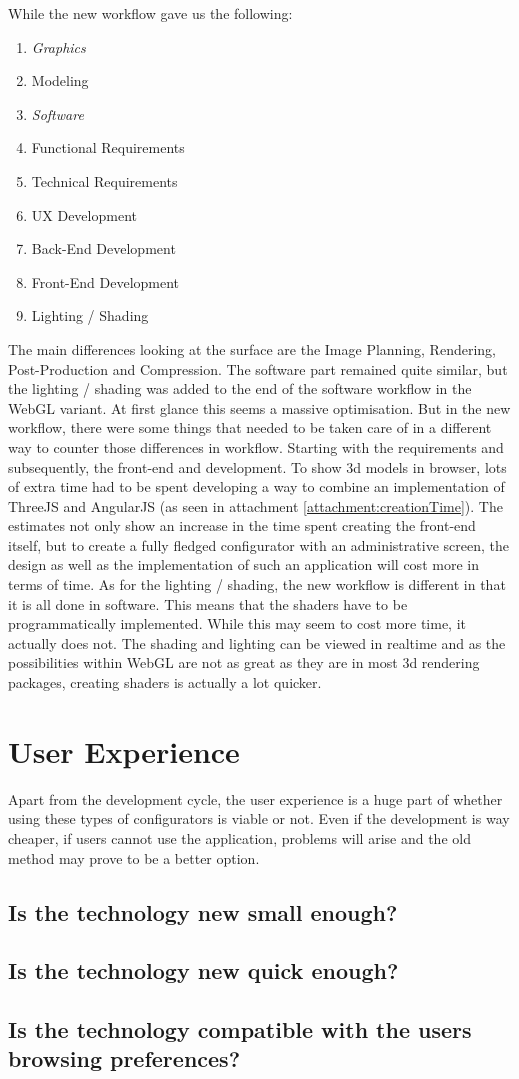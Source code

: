 While the new workflow gave us the following:
\begin{enumerate}
	\item {\textit{Graphics}}
	\item {Modeling}
	\item {\textit{Software}}
	\item {Functional Requirements}
	\item {Technical Requirements}
	\item {UX Development}
	\item {Back-End Development}
	\item {Front-End Development}
	\item {Lighting / Shading}
\end{enumerate}

The main differences looking at the surface are the Image Planning, Rendering, Post-Production and Compression. The software part remained quite similar, but the lighting / shading was added to the end of the software workflow in the WebGL variant. At first glance this seems a massive optimisation. But in the new workflow, there were some things that needed to be taken care of in a different way to counter those differences in workflow. Starting with the requirements and subsequently, the front-end and development. To show 3d models in browser, lots of extra time had to be spent developing a way to combine an implementation of ThreeJS and AngularJS (as seen in attachment \ref{attachment:creationTime}). The estimates not only show an increase in the time spent creating the front-end itself, but to create a fully fledged configurator with an administrative screen, the design as well as the implementation of such an application will cost more in terms of time.\newline
As for the lighting / shading, the new workflow is different in that it is all done in software. This means that the shaders have to be programmatically implemented. While this may seem to cost more time, it actually does not. The shading and lighting can be viewed in realtime and as the possibilities within WebGL are not as great as they are in most 3d rendering packages, creating shaders is actually a lot quicker.

\section{User Experience}
Apart from the development cycle, the user experience is a huge part of whether using these types of configurators is viable or not. Even if the development is way cheaper, if users cannot use the application, problems will arise and the old method may prove to be a better option.

\subsection {Is the technology new small enough?}
\subsection {Is the technology new quick enough?}
\subsection {Is the technology compatible with the users browsing preferences?}